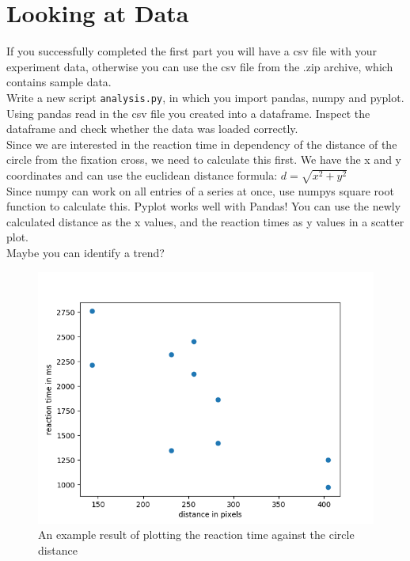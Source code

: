 \section{Looking at Data}
If you successfully completed the first part you will have a csv file with your
experiment data, otherwise you can use the csv file from the .zip archive, which
contains sample data.\\
Write a new script \texttt{analysis.py}, in which you import pandas, numpy and pyplot.
Using pandas read in the csv file you created into a dataframe. Inspect the 
dataframe and check whether the data was loaded correctly.\\
Since we are interested in the reaction time in dependency of the distance of the
circle from the fixation cross, we need to calculate this first. We have the x and y
coordinates and can use the euclidean distance formula: $d = \sqrt{x^2 + y^2}$\\
Since numpy can work on all entries of a series at once, use numpys square root function
to calculate this.
Pyplot works well with Pandas! You can use the newly calculated distance as the x
values, and the reaction times as y values in a scatter plot.\\
Maybe you can identify a trend?

\begin{figure}[h!]
	\centering
	\includegraphics[width=.6\textwidth]{scatter}
	\caption{An example result of plotting the reaction time against the circle distance}
\end{figure}


